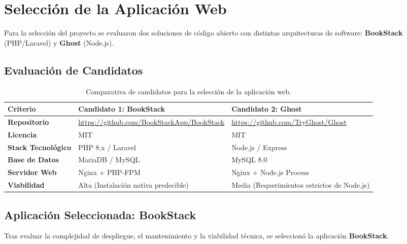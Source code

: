 \documentclass[12pt,a4paper]{article}
\begin{document}
\section{Selección de la Aplicación Web}

Para la selección del proyecto se evaluaron dos soluciones de código abierto con distintas arquitecturas de software: \textbf{BookStack} (PHP/Laravel) y \textbf{Ghost} (Node.js).

\subsection{Evaluación de Candidatos}

\begin{table}[h!]
\centering
\small
\begin{tabular}{|p{3cm}|p{5.5cm}|p{5.5cm}|}
\hline
\textbf{Criterio} & \textbf{Candidato 1: BookStack} & \textbf{Candidato 2: Ghost} \\ \hline
\textbf{Repositorio} & \url{https://github.com/BookStackApp/BookStack} & \url{https://github.com/TryGhost/Ghost} \\ \hline
\textbf{Licencia} & MIT & MIT \\ \hline
\textbf{Stack Tecnológico} & PHP 8.x / Laravel & Node.js / Express \\ \hline
\textbf{Base de Datos} & MariaDB / MySQL & MySQL 8.0 \\ \hline
\textbf{Servidor Web} & Nginx + PHP-FPM & Nginx + Node.js Process \\ \hline
\textbf{Viabilidad} & Alta (Instalación nativa predecible) & Media (Requerimientos estrictos de Node.js) \\ \hline
\end{tabular}
\caption{Comparativa de candidatos para la selección de la aplicación web.}
\label{tab:candidatos}
\end{table}

\subsection{Aplicación Seleccionada: BookStack}
Tras evaluar la complejidad de despliegue, el mantenimiento y la viabilidad técnica, se seleccionó la aplicación \textbf{BookStack}.
\end{document}
